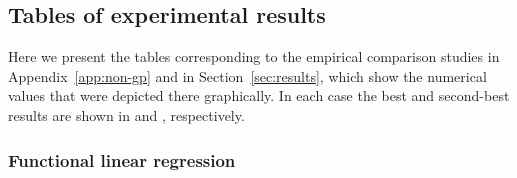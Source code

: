 \FloatBarrier{}
\newpage

\subsection{Tables of experimental results}\label{app:tables}

Here we present the tables corresponding to the empirical comparison studies in Appendix~\ref{app:non-gp} and in Section~\ref{sec:results}, which show the numerical values that were depicted there graphically. In each case the best and second-best results are shown in  and , respectively.

\subsubsection*{Functional linear regression}

